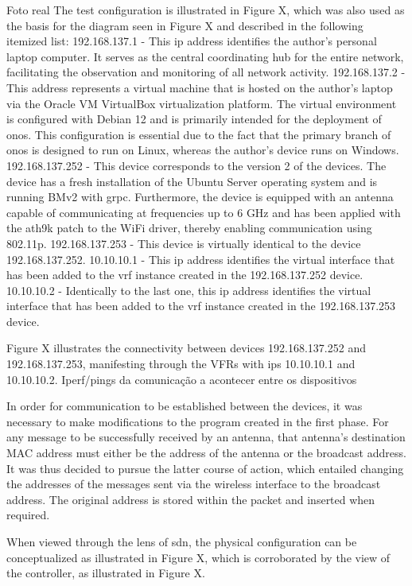 Foto real
The test configuration is illustrated in Figure X, which was also used as the basis for the diagram seen in Figure X and described in the following itemized list:
192.168.137.1 - This \gls{ip} address identifies the author's personal laptop computer. It serves as the central coordinating hub for the entire network, facilitating the observation and monitoring of all network activity.
192.168.137.2 - This address represents a virtual machine that is hosted on the author's laptop via the Oracle VM VirtualBox virtualization platform. The virtual environment is configured with Debian 12 and is primarily intended for the deployment of \gls{onos}. This configuration is essential due to the fact that the primary branch of \gls{onos} is designed to run on Linux, whereas the author's device runs on Windows.
192.168.137.252 - This device corresponds to the version 2 of the devices. The device has a fresh installation of the Ubuntu Server operating system and is running BMv2 with grpc. Furthermore, the device is equipped with an antenna capable of communicating at frequencies up to 6 GHz and has been applied with the ath9k patch to the WiFi driver, thereby enabling communication using 802.11p.
192.168.137.253 - This device is virtually identical to the device 192.168.137.252.
10.10.10.1 - This \gls{ip} address identifies the virtual interface that has been added to the \gls{vrf} instance created in the 192.168.137.252 device.
10.10.10.2 - Identically to the last one, this \gls{ip} address identifies the virtual interface that has been added to the \gls{vrf} instance created in the 192.168.137.253 device.

Figure X illustrates the connectivity between devices 192.168.137.252 and 192.168.137.253, manifesting through the VFRs with \glspl{ip} 10.10.10.1 and 10.10.10.2.
Iperf/pings da comunicação a acontecer entre os dispositivos

In order for communication to be established between the devices, it was necessary to make modifications to the program created in the first phase. For any message to be successfully received by an antenna, that antenna's destination MAC address must either be the address of the antenna or the broadcast address. It was thus decided to pursue the latter course of action, which entailed changing the addresses of the messages sent via the wireless interface to the broadcast address. The original address is stored within the packet and inserted when required.

When viewed through the lens of \gls{sdn}, the physical configuration can be conceptualized as illustrated in Figure X, which is corroborated by the view of the controller, as illustrated in Figure X.

